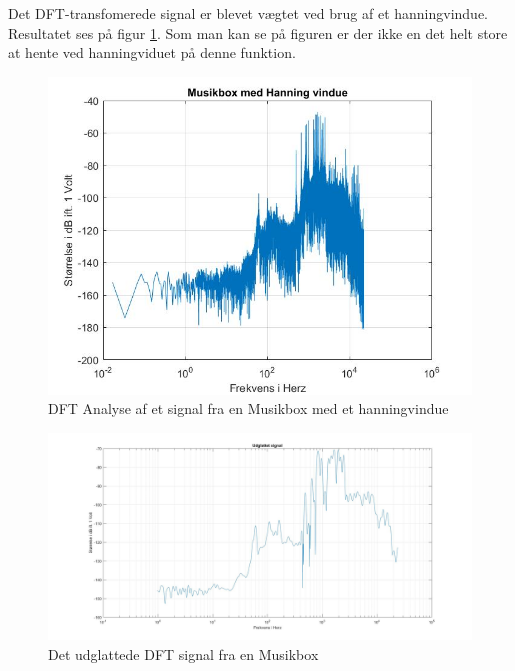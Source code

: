 Det DFT-transfomerede signal er blevet vægtet ved brug af et hanningvindue. Resultatet ses på figur \ref{fig:Musikbox hanning}. Som man kan se på figuren er der ikke en det helt store at hente ved hanningviduet på denne funktion.
\begin{figure}[H]
	\centering
	\includegraphics[width=140mm]{figures/Musikbox/hanning.jpg}
	\caption{DFT Analyse af et signal fra en Musikbox med et hanningvindue}
	\label{fig:Musikbox hanning}
\end{figure}

\begin{figure}[H]
	\centering
	\includegraphics[width=140mm]{figures/Musikbox/udglattet.jpg}
	\caption{Det udglattede DFT signal fra en Musikbox}
	\label{fig:Musikbox udglattet}
\end{figure}


